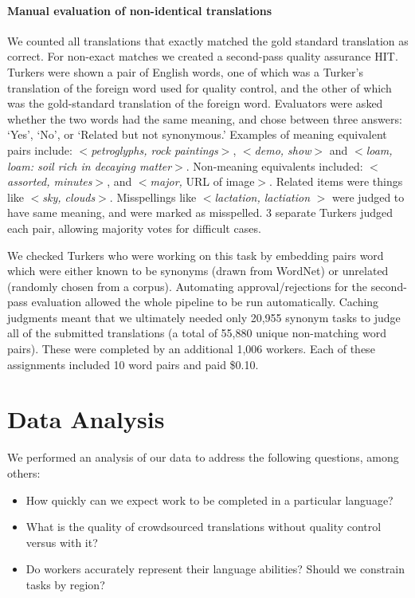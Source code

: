 \documentclass[11pt]{article}
\begin{document}
\paragraph{Manual evaluation of non-identical translations}
We counted all translations that exactly matched the gold standard translation as correct.  For non-exact matches we created a second-pass quality assurance HIT.  
Turkers were shown a pair of English words, one of which was a Turker's translation of the foreign word used for quality control, and the other of which was the gold-standard translation of the foreign word. Evaluators were asked whether the two words had the same meaning, and chose between three answers: `Yes', `No', or `Related but not synonymous.'  Examples of meaning equivalent pairs include: $<${\it petroglyphs, rock paintings}$>$, $<${\it demo, show}$>$ and  $<${\it loam, loam: soil rich in decaying matter}$>$.  Non-meaning equivalents included: $<${\it assorted, minutes}$>$, and $<${\it major,} URL of image$>$.  Related items were things like $<${\it sky, clouds}$>$. Misspellings like $<${\it lactation, lactiation} $>$ were judged to have same meaning, and were marked as misspelled.   3 separate Turkers judged each pair, allowing majority votes for difficult cases. 


We checked Turkers who were working on this task by embedding pairs word which were either known to be synonyms (drawn from WordNet) or  unrelated (randomly chosen from a corpus). 
Automating approval/rejections for the second-pass evaluation allowed the whole pipeline to be run automatically.  Caching judgments meant that we ultimately needed only 
20,955 synonym tasks to judge all of the submitted translations (a total of 55,880 unique non-matching word pairs).  These were completed by an additional 1,006 workers.  Each of these assignments included 10 word pairs and paid \$0.10.


\section{Data Analysis}

We performed an analysis of our data to address the following questions, among others:
\begin{itemize}
\item How quickly can we expect work to be completed in a particular language? 
\item What is the quality of crowdsourced translations without quality control versus with it? 
\item Do workers accurately represent their language abilities?  Should we constrain tasks by region? 
\end{itemize}
\end{document}
